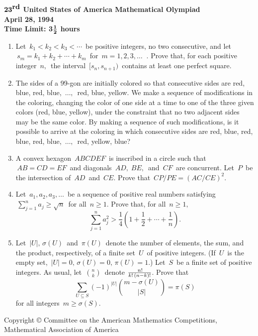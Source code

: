 \pagestyle{empty}
\setlength{\oddsidemargin}{.15in}
\setlength{\evensidemargin}{.15in}
\setlength{\textwidth}{6.05in}
\setlength{\textheight}{9in}
\setlength{\parskip}{15pt}
\setlength{\labelsep}{15pt}
\setlength{\parindent}{0pt}
\setlength{\medskipamount}{3ex} 
\setlength{\smallskipamount}{1ex}
\def\binom#1#2{{#1\choose#2}}

\setlength{\baselineskip}{.25in}
\begin{center}
${\bf 23}^{\mbox{\bf rd}}$ {\bf United States of America
Mathematical
Olympiad}
\\[.1in]
{\bf April 28, 1994}\\
{\bf Time Limit: 3}${{\bf 1}\over{\bf 2}}$ {\bf
hours}
\end{center}
\begin{enumerate}
\item %
Let $\, k_1 < k_2 < k_3 < \cdots \,$ be positive integers, no two
consecutive, and let $\, s_m = k_1 + k_2 + \cdots + k_m \,$ for 
$\, m = 1,2,3, \ldots  \; \;$.  Prove that, for each positive
integer $\, n, \,$ the interval $\, [s_n, s_{n+1}) \,$ contains 
at least one perfect square.
\item %
The sides of a 99-gon are initially colored so that consecutive
sides are red, blue, red, blue, $\,\ldots, \,$ red, blue, yellow. 
We make a sequence of modifications in the coloring, changing the
color of one side at a time to one of the three given colors (red,
blue, yellow), under the constraint that no two adjacent sides may 
be the same color.  By making a sequence of such modifications, is
it possible to arrive at the coloring in which consecutive sides
are red, blue, red, blue, red, blue, $\, \ldots, \,$ red, yellow,
blue?
\item %
A convex hexagon $\, ABCDEF \,$ is inscribed in a circle such 
that $\, AB = CD = EF \,$ and diagonals $\, AD, \; BE, \,$ and 
$\, CF \,$ are concurrent. Let $\, P \,$ be the intersection of
$\, AD \,$ and $\, CE$.  Prove that $\, CP/PE = ( AC/CE )^2$.
\item %
Let $\, a_1, a_2, a_3, \ldots \,$ be a sequence of positive real
numbers satisfying $\, \sum_{j=1}^n a_j \geq \sqrt{n} \,$ for all
$\, n \geq 1$. Prove that, for all $\, n \geq 1, \,$
\[
\sum_{j=1}^n a_j^2 > \frac{1}{4} \left( 1 + \frac{1}{2} +
\cdots + \frac{1}{n} \right).
\]
\item %
Let $\, |U|, \, \sigma(U) \,$ and $\, \pi(U) \,$ denote the
number of elements, the sum, and the product, respectively, of a
finite set $\, U \,$ of positive integers.  (If $\, U \,$ is the
empty set, $\, |U| = 0, \, \sigma(U) = 0, \, \pi(U) = 1$.)
Let $\, S \,$ be a finite set of positive integers. As usual, let
$\, \binom{n}{k} \,$ denote $\, n! \over k! \, (n-k)!$. Prove that
\[
\sum_{U \subseteq S} (-1)^{|U|} \binom{m - \sigma(U)}{|S|} =
\pi(S)
\]
for all integers $\, m \geq \sigma(S)$.  
\end{enumerate}
\vspace*{\fill}
\begin{center}
{\footnotesize Copyright \copyright \hspace{.05in} Committee on
the American
Mathematics Competitions, \\ Mathematical Association of America}
\end{center}


